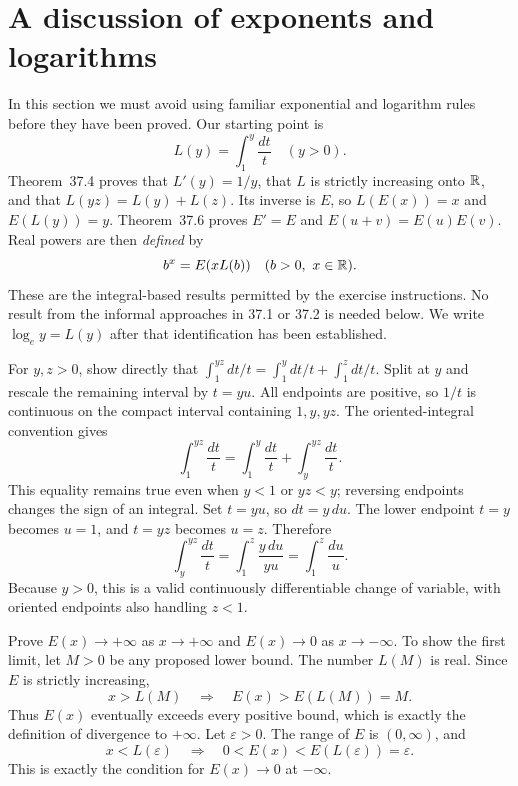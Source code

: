\section{A discussion of exponents and logarithms}
\label{sec:exponents-logarithms}
In this section we must avoid using familiar exponential and logarithm
rules before they have been proved. Our starting point is
\[
 L(y)=\int_1^y\frac{dt}{t}\quad(y>0).
\]
Theorem~37.4 proves that $L'(y)=1/y$, that $L$ is strictly increasing
onto $\mathbb{R}$, and that $L(yz)=L(y)+L(z)$. Its inverse is $E$, so
$L(E(x))=x$ and $E(L(y))=y$. Theorem~37.6 proves
$E'=E$ and $E(u+v)=E(u)E(v)$. Real powers are then \emph{defined} by
\[
 b^x=E(xL(b))\quad(b>0,\ x\in\mathbb{R}).
\]
These are the integral-based results permitted by the exercise
instructions. No result from the informal approaches in 37.1 or 37.2
is needed below. We write $\log_e y=L(y)$ after that identification
has been established.

\goal For $y,z>0$, show directly that
$\int_1^{yz}dt/t=\int_1^y dt/t+\int_1^z dt/t$.
\idea Split at $y$ and rescale the remaining interval by $t=yu$.
All endpoints are positive, so $1/t$ is continuous on the compact
interval containing $1,y,yz$. The oriented-integral convention gives
\[
 \int_1^{yz}\frac{dt}{t}
 =\int_1^y\frac{dt}{t}+\int_y^{yz}\frac{dt}{t}.
\]
This equality remains true even when $y<1$ or $yz<y$; reversing
endpoints changes the sign of an integral.
Set $t=yu$, so $dt=y\,du$. The lower endpoint $t=y$ becomes
$u=1$, and $t=yz$ becomes $u=z$. Therefore
\[
 \int_y^{yz}\frac{dt}{t}
 =\int_1^z\frac{y\,du}{yu}=\int_1^z\frac{du}{u}.
\]
Because $y>0$, this is a valid continuously differentiable change
of variable, with oriented endpoints also handling $z<1$.

\goal Prove $E(x)\to+\infty$ as $x\to+\infty$ and
$E(x)\to0$ as $x\to-\infty$.
To show the first limit, let $M>0$ be any proposed lower bound.
The number $L(M)$ is real. Since $E$ is strictly increasing,
\[
 x>L(M)\quad\Longrightarrow\quad E(x)>E(L(M))=M.
\]
Thus $E(x)$ eventually exceeds every positive bound, which is
exactly the definition of divergence to $+\infty$.
Let $\varepsilon>0$. The range of $E$ is $(0,\infty)$, and
\[
 x<L(\varepsilon)
 \quad\Longrightarrow\quad0<E(x)<E(L(\varepsilon))=\varepsilon.
\]
This is exactly the condition for $E(x)\to0$ at $-\infty$.

